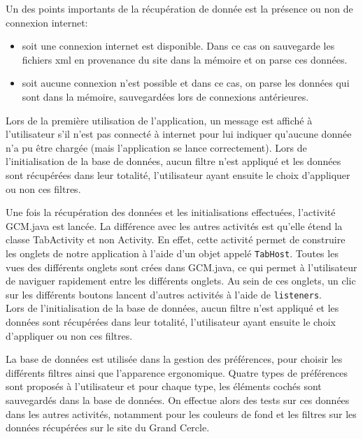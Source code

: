 \documentclass[a4paper, 11px]{article}
\begin{document}
\vspace{0.5cm}
\noindent Un des points importants de la récupération de donnée est la présence ou non de connexion internet: 
\begin{itemize}
\item soit une connexion internet est disponible. Dans ce cas on sauvegarde les fichiers xml en provenance du site dans la mémoire et on parse ces données.\\
\item soit aucune connexion n'est possible et dans ce cas, on parse les données qui sont dans la mémoire, sauvegardées lors de connexions antérieures.\\
\end{itemize}

\noindent Lors de la première utilisation de l'application, un message est affiché à l'utilisateur s'il n'est pas connecté à internet pour lui indiquer qu'aucune donnée n'a pu être chargée (mais l'application se lance correctement).
 Lors de l'initialisation de la base de données, aucun filtre n'est appliqué et les données sont récupérées dans leur totalité, l'utilisateur ayant ensuite le choix d'appliquer ou non ces filtres.

Une fois la récupération des données et les initialisations effectuées, l'activité GCM.java est lancée. La différence avec les autres activités est qu'elle étend la classe TabActivity et non Activity. En effet, cette activité permet de construire les onglets de notre application à l'aide d'un objet appelé \texttt{TabHost}. Toutes les vues des différents onglets sont crées dans GCM.java, ce qui permet à l'utilisateur de naviguer rapidement entre les différents onglets.
Au sein de ces onglets, un clic sur les différents boutons lancent d'autres activités à l'aide de \texttt{listeners}.\\

Lors de l'initialisation de la base de données, aucun filtre n'est appliqué et les données sont récupérées dans leur totalité, l'utilisateur ayant ensuite le choix d'appliquer ou non ces filtres.

La base de données est utilisée dans la gestion des préférences, pour choisir les différents filtres ainsi que l'apparence ergonomique. Quatre types de préférences sont proposés à l'utilisateur et pour chaque type, les éléments cochés sont sauvegardés dans la base de données. On effectue alors des tests sur ces données dans les autres activités, notamment pour les couleurs de fond et les filtres sur les données récupérées sur le site du Grand Cercle.\\
\end{document}
